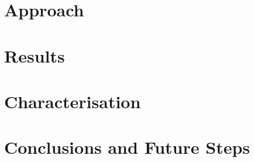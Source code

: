 \documentclass[letterpaper, 10 pt, conference]{ieeeconf}
\begin{document}
\section{Approach}
  \label{section:the_proposed_method}
  

\section{Results}
  \label{section:results}
  

\section{Characterisation}
  \label{section:characterisation}
  

\section{Conclusions and Future Steps}
  \label{section:finale}
  






\balance
\end{document}
